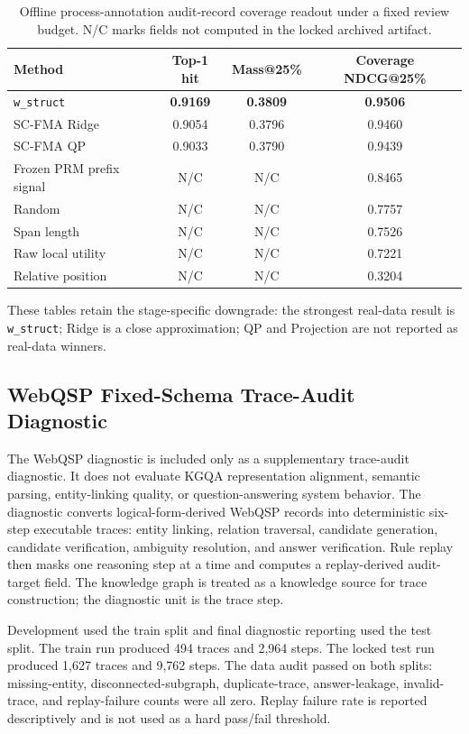 \documentclass[a4paper,fleqn]{cas-sc}
\begin{document}
\begin{table}[ht]
\caption{Offline process-annotation audit-record coverage readout under a fixed review budget. N/C marks fields not computed in the locked archived artifact.}
\label{tab:supp-audit-prioritization}
\centering
\small
\begin{tabular}{lccc}
\toprule
\textbf{Method} & \textbf{Top-1 hit} & \textbf{Mass@25\%} & \textbf{Coverage NDCG@25\%} \\
\midrule
\texttt{w\_struct} & \textbf{0.9169} & \textbf{0.3809} & \textbf{0.9506} \\
SC-FMA Ridge & 0.9054 & 0.3796 & 0.9460 \\
SC-FMA QP & 0.9033 & 0.3790 & 0.9439 \\
Frozen PRM prefix signal & N/C & N/C & 0.8465 \\
Random & N/C & N/C & 0.7757 \\
Span length & N/C & N/C & 0.7526 \\
Raw local utility & N/C & N/C & 0.7221 \\
Relative position & N/C & N/C & 0.3204 \\
\bottomrule
\end{tabular}
\end{table}

These tables retain the stage-specific downgrade: the strongest real-data result is \texttt{w\_struct}; Ridge is a close approximation; QP and Projection are not reported as real-data winners.

\subsection{WebQSP Fixed-Schema Trace-Audit Diagnostic}
\label{app:webqsp-trace-audit}

The WebQSP diagnostic is included only as a supplementary trace-audit diagnostic. It does not evaluate KGQA representation alignment, semantic parsing, entity-linking quality, or question-answering system behavior. The diagnostic converts logical-form-derived WebQSP records into deterministic six-step executable traces: entity linking, relation traversal, candidate generation, candidate verification, ambiguity resolution, and answer verification. Rule replay then masks one reasoning step at a time and computes a replay-derived audit-target field. The knowledge graph is treated as a knowledge source for trace construction; the diagnostic unit is the trace step.

Development used the train split and final diagnostic reporting used the test split. The train run produced 494 traces and 2,964 steps. The locked test run produced 1,627 traces and 9,762 steps. The data audit passed on both splits: missing-entity, disconnected-subgraph, duplicate-trace, answer-leakage, invalid-trace, and replay-failure counts were all zero. Replay failure rate is reported descriptively and is not used as a hard pass/fail threshold.
\end{document}
